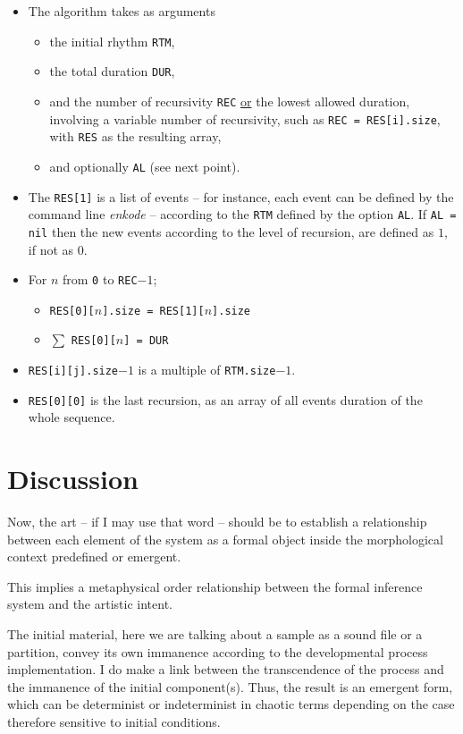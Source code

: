 \begin{itemize}[label=\textbullet]
\item The algorithm takes as arguments
\begin{itemize}[label=$\rightarrow$]
\item  the initial rhythm \texttt{RTM}, 
 \item the total duration \texttt{DUR},
 \item  and the number of recursivity \texttt{REC} \underline{or} the \hbox{lowest} allowed duration, involving a variable number of recursivity, such as \texttt{REC = RES[i].size}, with \texttt{RES} as the resulting array, 
 \item and optionally \texttt{AL} (see next point). 
 \end{itemize}
\item The \texttt{RES[1]} is a list of events -- for instance, each event can be defined by the command line \textsl{enkode}
 -- according to the \texttt{RTM} defined by the option \texttt{AL}. If \texttt{AL = nil} then the new events according to the level of recursion, are defined as $1$, if not as $0$.
\item For $n$ from \texttt{0} to \texttt{REC$-1$};
\begin{itemize}[label=$\rightarrow$]
\item \texttt{RES[0][$n$].size = RES[1][$n$].size}
\item $\sum$ \texttt{RES[0][}$n$\texttt{] =  DUR}
\end{itemize}
\item \texttt{RES[i][j].size$-1$} is a multiple of \texttt{RTM.size$-1$}.

\item \texttt{RES[0][0]} is the last recursion, as an array of all events duration of the whole sequence.

\end{itemize}

\section{Discussion}
\label{Discussion}

{Now, the art -- if I may use that word -- should be to establish a relationship between each element of the system as a formal object inside the morphological context predefined or emergent.

This implies a metaphysical order relationship between the formal inference system and the artistic intent.}

{The initial material, here we are talking about a sample as a sound file or a partition, convey its own immanence according to the developmental process implementation. I do make a link between the transcendence of the process and the immanence of the initial component(s). Thus, the result is an emergent form, which can be determinist or indeterminist in chaotic terms \citep{tdc} depending on the case therefore sensitive to initial conditions.}
